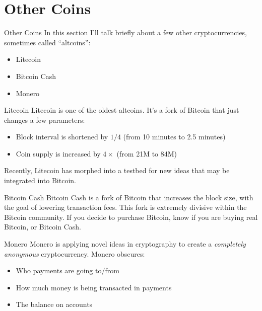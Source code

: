 \documentclass[14pt]{beamer}
\begin{document}
\section{Other Coins}

\begin{frame}{Other Coins}
  In this section I'll talk briefly about a few other cryptocurrencies,
  sometimes called ``altcoins'':

  \begin{itemize}
  \item Litecoin
  \item Bitcoin Cash
  \item Monero
  \end{itemize}
\end{frame}

\begin{frame}{Litecoin}
  Litecoin is one of the oldest altcoins. It's a fork of Bitcoin that just changes a few parameters:
  \newline
  \begin{itemize}
  \item Block interval is shortened by $1 / 4$ (from 10 minutes to 2.5 minutes)
  \item Coin supply is increased by $4 \times$ (from 21M to 84M)
  \end{itemize}
  Recently, Litecoin has morphed into a testbed for new ideas that may be
  integrated into Bitcoin.
\end{frame}

\begin{frame}{Bitcoin Cash}
  Bitcoin Cash is a fork of Bitcoin that increases the block size, with the goal
  of lowering transaction fees.
  \newline
  \newline
  This fork is extremely divisive within the Bitcoin community.
  \newline
  \newline
  If you decide to purchase Bitcoin, know if you are buying real Bitcoin, or
  Bitcoin Cash.
\end{frame}

\begin{frame}{Monero}
  Monero is applying novel ideas in cryptography to create a \emph{completely
    anonymous} cryptocurrency.
  \newline
  \newline
  Monero obscures:
  \begin{itemize}
  \item Who payments are going to/from
  \item How much money is being transacted in payments
  \item The balance on accounts
  \end{itemize}
\end{frame}
\end{document}
